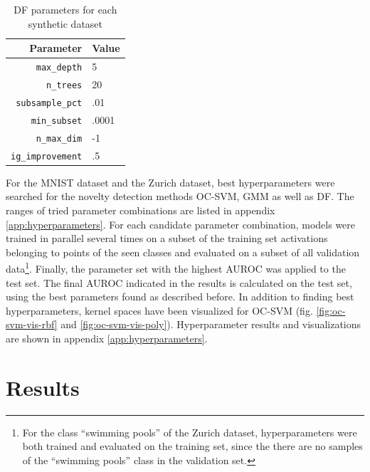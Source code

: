 \documentclass[10pt]{article}
\begin{document}
\begin{table}[H]
    \centering
    \small
    \begin{tabular}{rl}
        \toprule
        Parameter & Value \\ \midrule
        \texttt{max\_depth} & 5 \\
        \texttt{n\_trees} & 20  \\
        \texttt{subsample\_pct} & .01  \\
        \texttt{min\_subset} & .0001 \\
        \texttt{n\_max\_dim} & -1 \\
        \texttt{ig\_improvement} & .5 \\\bottomrule
    \end{tabular}
    \caption{\acrlong{DF} parameters for each synthetic dataset}
    \label{table:synthetic-parameters}
\end{table}

For the \gls{MNIST} dataset and the Zurich dataset, best hyperparameters were searched for the novelty detection methods \gls{OC-SVM}, \gls{GMM} as well as \acrlong{DF}. The ranges of tried parameter combinations are listed in appendix \ref{app:hyperparameters}. For each candidate parameter combination, models were trained in parallel several times on a subset of the training set activations belonging to points of the seen classes and evaluated on a subset of all validation data\footnote{For the class ``swimming pools'' of the Zurich dataset, hyperparameters were both trained and evaluated on the training set, since the there are no samples of the ``swimming pools'' class in the validation set.}. Finally, the parameter set with the highest \gls{AUROC} was applied to the test set. The final AUROC indicated in the results is calculated on the test set, using the best parameters found as described before. In addition to finding best hyperparameters, kernel spaces have been visualized for \gls{OC-SVM}  (fig. \ref{fig:oc-svm-vis-rbf} and \ref{fig:oc-svm-vis-poly}). Hyperparameter results and visualizations are shown in appendix \ref{app:hyperparameters}.


\section{Results}
\label{sec:results}
\end{document}
